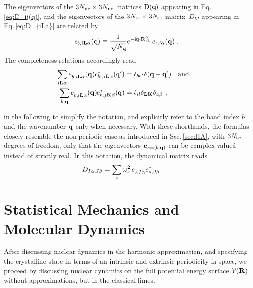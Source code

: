 The eigenvectors of the $3N_{\rm uc} \times 3N_{\rm uc}$ matrices $\mathrm D ({\bf q})$ appearing in Eq.\,\eqref{eq:D_ij(q)}, and the eigenvectors of the $3N_{\rm sc} \times 3N_{\rm sc}$ matrix~$D_{IJ}$ appearing in Eq.\,\eqref{eq:D_{iLa}} are related by
\begin{align}
	e_{b, i {\bf L} \alpha} ({\bf q})
		\equiv \frac{1}{\sqrt{N_{{\bf q}}}} {\rm e}^{- {\rm i} {\bf q}  \cdot {\bf R}^0_{i {\bf L}}} \, e_{b, i \alpha} ({\bf q})~.
\end{align}
The completeness relations accordingly read
\begin{align}
	\sum_{i \b L \alpha} \fD e_{b, i \b L \alpha} (\b q) e^\ast_{b', i \b L \alpha} (\b q') 
		&= \delta_{b b'} \delta (\b q - \b q') \quad \text{and} \quad \\
	\sum_{b, \b q} \fD e_{b, i \b L \alpha} (\b q) e^\ast_{b, j \b K \beta} (\b q)
		&= \delta_{il} \delta_{\b L \b K} \delta_{\alpha \beta}~,
	\label{eq:completeness.e_bq}
\end{align}

 in the following to simplify the notation, and explicitly refer to the band index $b$ and the wavenumber ${\bf q}$ only when necessary.
With these shorthands, the formulas closely resemble the non-periodic case as introduced in Sec.\,\ref{sec:HA}, with $3N_{\rm sc}$ degrees of freedom, only that the eigenvectors ${\bf e}_{s = (b, {\bf q})}$ can be complex-valued instead of strictly real. In this notation, the dynamical matrix reads
\begin{align}
D_{I \alpha, J \beta}
&= \sum_s \omega^{2}_{s \vphantom I} \, \fD e_{s, I \alpha} e^\ast_{s, J \beta}~.
\label{eq:D_IJ_s_complex}
\end{align}




\newpage

\section{Statistical Mechanics and Molecular Dynamics}
After discussing nuclear dynamics in the harmonic approximation, and specifying the crystalline state in terms of an intrinsic and extrinsic periodicity in space, we proceed by discussing nuclear dynamics on the full potential energy surface $\mathcal{V} ({\bf R})$ without approximations, but in the classical limes.

